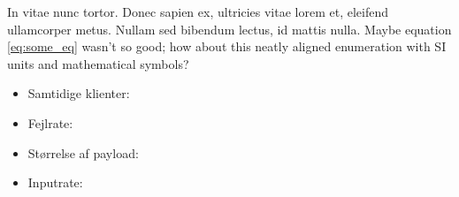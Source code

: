 In vitae nunc tortor. Donec sapien ex, ultricies vitae lorem et, eleifend ullamcorper metus. Nullam sed bibendum lectus, id mattis nulla. Maybe equation \ref{eq:some_eq} wasn't so good; how about this neatly aligned enumeration with SI units and mathematical symbols?\medskip

\begin{itemize}[noitemsep]
    \item Samtidige klienter:
    \item Fejlrate: 
    \item Størrelse af payload: 
    \item Inputrate:
\end{itemize}